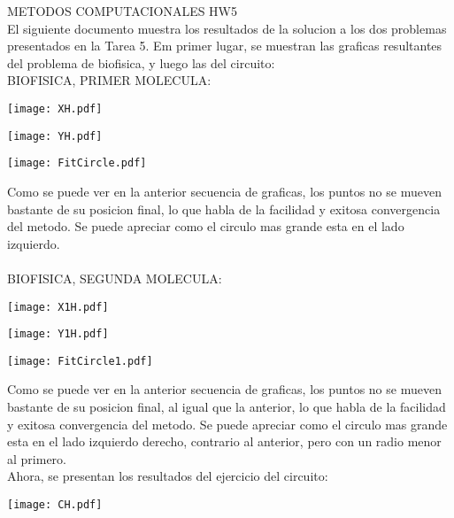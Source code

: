 \documentclass{article}
\begin{document}
METODOS COMPUTACIONALES HW5\\

El siguiente documento muestra los resultados de la solucion a los dos problemas presentados en la Tarea 5. Em primer lugar, se muestran las graficas resultantes del problema de biofisica, y luego las del circuito:\\
BIOFISICA, PRIMER MOLECULA:\\

\begin{center}
\texttt{[image: XH.pdf]}
\end{center}

\begin{center}
\texttt{[image: YH.pdf]}
\end{center}

\begin{center}
\texttt{[image: FitCircle.pdf]}
\end{center}
Como se puede ver en la anterior secuencia de graficas, los puntos no se mueven bastante de su posicion final, lo que habla de la facilidad y exitosa convergencia del metodo. Se puede apreciar como el circulo mas grande esta en el lado izquierdo.\\
\\

BIOFISICA, SEGUNDA MOLECULA:\\

\begin{center}
\texttt{[image: X1H.pdf]}
\end{center}

\begin{center}
\texttt{[image: Y1H.pdf]}
\end{center}

\begin{center}
\texttt{[image: FitCircle1.pdf]}
\end{center}
Como se puede ver en la anterior secuencia de graficas, los puntos no se mueven bastante de su posicion final, al igual que la anterior, lo que habla de la facilidad y exitosa convergencia del metodo. Se puede apreciar como el circulo mas grande esta en el lado izquierdo derecho, contrario al anterior, pero con un radio menor al primero.\\
Ahora, se presentan los resultados del ejercicio del circuito:
\\
\begin{center}
\texttt{[image: CH.pdf]}
\end{center}
\end{document}
